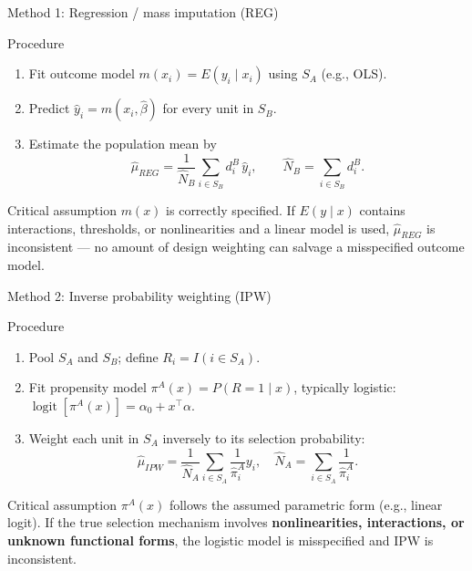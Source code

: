 \documentclass[aspectratio=169,11pt]{beamer}
\begin{document}
\begin{frame}{Method 1: Regression / mass imputation (REG)}
\begin{block}{Procedure}
\begin{enumerate}
  \item Fit outcome model $m(x_i)=E(y_i\mid x_i)$ using $S_A$ (e.g., OLS).
  \item Predict $\hat{y}_i=m(x_i,\hat{\beta})$ for every unit in $S_B$.
  \item Estimate the population mean by
  \[
  \hat{\mu}_{REG}=\frac{1}{\hat{N}_B}\sum_{i\in S_B}d_i^B\,\hat{y}_i,\qquad
  \hat{N}_B=\sum_{i\in S_B}d_i^B.
  \]
\end{enumerate}
\end{block}
\vspace{0.2cm}
\begin{alertblock}{Critical assumption}
$m(x)$ is correctly specified. If $E(y\mid x)$ contains interactions, thresholds, or nonlinearities and a linear model is used, $\hat{\mu}_{REG}$ is inconsistent — no amount of design weighting can salvage a misspecified outcome model.
\end{alertblock}
\end{frame}

\begin{frame}{Method 2: Inverse probability weighting (IPW)}
\begin{block}{Procedure}
\begin{enumerate}
  \item Pool $S_A$ and $S_B$; define $R_i=I(i\in S_A)$.
  \item Fit propensity model $\pi^A(x)=P(R=1\mid x)$, typically logistic:
  $\operatorname{logit}[\pi^A(x)]=\alpha_0+x^{\top}\alpha.$
  \item Weight each unit in $S_A$ inversely to its selection probability:
  \[
  \hat{\mu}_{IPW}=\frac{1}{\hat{N}_A}\sum_{i\in S_A}\frac{1}{\hat{\pi}_i^A}y_i,\quad
  \hat{N}_A=\sum_{i\in S_A}\frac{1}{\hat{\pi}_i^A}.
  \]
\end{enumerate}
\end{block}
\vspace{0.1cm}
\begin{alertblock}{Critical assumption}
$\pi^A(x)$ follows the assumed parametric form (e.g., linear logit). If the true selection mechanism involves \textbf{nonlinearities, interactions, or unknown functional forms}, the logistic model is misspecified and IPW is inconsistent.
\end{alertblock}
\end{frame}
\end{document}
